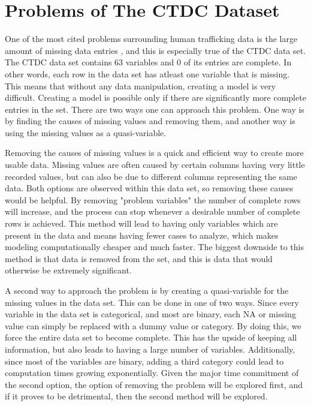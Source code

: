\documentclass{article} %
\begin{document}
	
	
	\newpage
	
	
	
	
	
	
	
	
	
	
	
	
	
	
	
	
	
	\section{Problems of The CTDC Dataset}
	
	One of the most cited problems surrounding human trafficking data is the large amount of missing data entries \parencite{SlaveBook, polarisTypology}, and this is especially true of the CTDC data set. The CTDC data set contains 63 variables and 0 of its entries are complete. In other words, each row in the data set has atleast one variable that is missing. This means that without any data manipulation, creating a model is very difficult. Creating a model is possible only if there are significantly more complete entries in the set. There are two ways one can approach this problem. One way is by finding the causes of missing values and removing them, and another way is using the missing values as a quasi-variable. 
	
	Removing the causes of missing values is a quick and efficient way to create more usable data. Missing values are often caused by certain columns having very little recorded values, but can also be due to different columns representing the same data. Both options are observed within this data set, so removing these causes would be helpful. By removing "problem variables" the number of complete rows will increase, and the process can stop whenever a desirable number of complete rows is achieved. This method will lead to having only variables which are present in the data and means having fewer cases to analyze, which makes modeling computationally cheaper and much faster. The biggest downside to this method is that data is removed from the set, and this is data that would otherwise be extremely significant.
	
	A second way to approach the problem is by creating a quasi-variable for the missing values in the data set. This can be done in one of two ways. Since every variable in the data set is categorical, and most are binary, each NA or missing value can simply be replaced with a dummy value or category. By doing this, we force the entire data set to become complete. This has the upside of keeping all information, but also leads to having a large number of variables. Additionally, since most of the variables are binary, adding a third category could lead to computation times growing exponentially. Given the major time commitment of the second option, the option of removing the problem will be explored first, and if it proves to be detrimental, then the second method will be explored.
	
\end{document}

